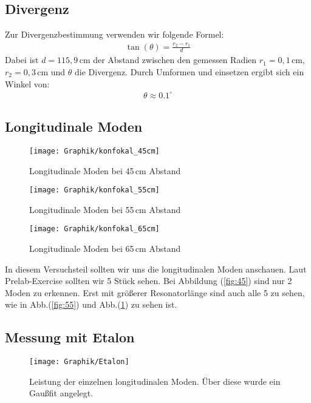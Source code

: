 \documentclass[10pt,twoside]{article}
\renewcommand{\1}{^{-1}}
\renewcommand{\2}{^{-2}}
\newcommand{\3}{^{-3}}
\newcommand{\4}{^{-4}}
\newcommand{\5}{^{-5}}
\newcommand{\6}{^{-6}}
\newcommand{\7}{^{-7}}
\newcommand{\8}{^{-8}}
\newcommand{\9}{^{-9}}
\begin{document}
\subsection{Divergenz}

Zur Divergenzbestimmung verwenden wir folgende Formel:
\begin{align*}
\tan(\theta) = \frac{r_2 - r_1}{d}
\end{align*}
Dabei ist $d=115,9$\,cm der Abstand zwischen den gemessen Radien $r_1=0,1$\,cm,$r_2=0,3$\,cm und $\theta$ die Divergenz. Durch Umformen und einsetzen ergibt sich ein Winkel von:
\begin{align*}
\theta \approx 0.1^{\circ}
\end{align*}

\subsection{Longitudinale Moden}

\begin{figure}[!htb]
  \texttt{[image: Graphik/konfokal\_45cm]}
  \caption{Longitudinale Moden bei 45\,cm Abstand}\label{fig:45}
\endminipage\hfill
{}
  \texttt{[image: Graphik/konfokal\_55cm]}
  \caption{Longitudinale Moden bei 55\,cm Abstand}\label{fig:55}
\endminipage\hfill
{}
  \texttt{[image: Graphik/konfokal\_65cm]}
  \caption{Longitudinale Moden bei 65\,cm Abstand}\label{fig:65}
\endminipage
\end{figure} \par

In diesem Versuchsteil sollten wir uns die longitudinalen Moden anschauen. Laut Prelab-Exercise sollten wir 5 Stück sehen. Bei Abbildung (\ref{fig:45}) sind nur 2 Moden zu erkennen. Erst mit größerer Resonatorlänge sind auch alle 5 zu sehen, wie in Abb.(\ref{fig:55}) und Abb.(\ref{fig:65}) zu sehen ist.   

\subsection{Messung mit Etalon}

\begin{figure}[H]
\centering
\texttt{[image: Graphik/Etalon]} 
\caption{Leistung der einzelnen longitudinalen Moden. Über diese wurde ein Gaußfit angelegt.}
\label{fig:Etalon}
\end{figure}
\end{document}
